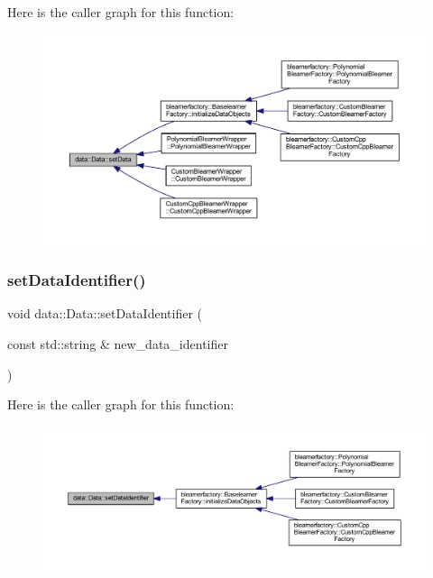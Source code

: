 Here is the caller graph for this function\+:\nopagebreak
\begin{figure}[H]
\begin{center}
\leavevmode
\includegraphics[width=350pt]{classdata_1_1_data_a0e928c49b31f803e7984cc24e2f73f70_icgraph}
\end{center}
\end{figure}
\mbox{\label{classdata_1_1_data_a62bcea680e1a7d1d4ecec60c111936dc}} 
\subsubsection{\texorpdfstring{set\+Data\+Identifier()}{setDataIdentifier()}}
{\footnotesize\ttfamily void data\+::\+Data\+::set\+Data\+Identifier (\begin{DoxyParamCaption}\item[{const std\+::string \&}]{new\+\_\+data\+\_\+identifier }\end{DoxyParamCaption})}

Here is the caller graph for this function\+:\nopagebreak
\begin{figure}[H]
\begin{center}
\leavevmode
\includegraphics[width=350pt]{classdata_1_1_data_a62bcea680e1a7d1d4ecec60c111936dc_icgraph}
\end{center}
\end{figure}


